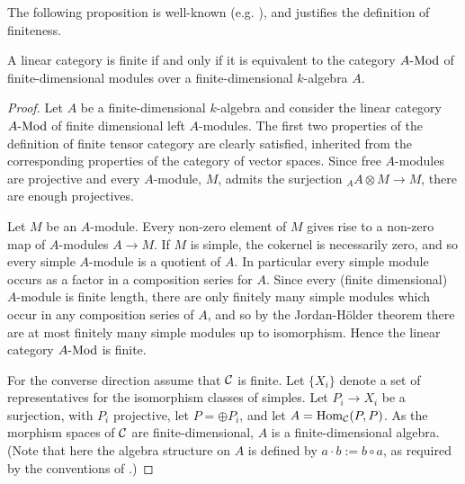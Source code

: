 \documentclass{amsart}
\begin{document}
The following proposition is well-known (e.g. \cite[\S9.6]{MR2808160}), and justifies the definition of finiteness.

\begin{proposition}
A linear category is finite if and only if it is equivalent to the category $\Mod{A}{}$ of finite-dimensional modules over a finite-dimensional $k$-algebra $A$.
\end{proposition}
\begin{proof}
	Let $A$ be a finite-dimensional $k$-algebra and consider the linear category $\Mod{A}{}$ of finite dimensional left $A$-modules. The first two properties of the definition of finite tensor category are clearly satisfied, inherited from the corresponding properties of the category of vector spaces. Since free $A$-modules are projective and every $A$-module, $M$, admits the surjection ${}_A A \otimes M \to M$, there are enough projectives. 
	
	Let $M$ be an $A$-module. Every non-zero element of $M$ gives rise to a non-zero map of $A$-modules $A \to M$. If $M$ is simple, the cokernel is necessarily zero, and so every simple $A$-module is a quotient of $A$. In particular every simple module occurs as a factor in a composition series for $A$. Since every (finite dimensional) $A$-module is finite length, there are only finitely many simple modules which occur in any composition series of $A$, and so by the Jordan-H\"older theorem there are at most finitely many simple modules up to isomorphism. Hence the linear category $\Mod{A}{}$ is finite.
	
	For the converse direction assume that $\mathcal C$ is finite. Let $\{X_i\}$ denote a set of representatives for the isomorphism classes of simples. Let $P_i \to X_i$ be a surjection, with $P_i$ projective, let $P = \oplus P_i$, and let $A = \operatorname{Hom}_{\mathcal C}(P,P)$. As the morphism spaces of $\mathcal C$ are finite-dimensional, $A$ is a finite-dimensional algebra.  (Note that here the algebra structure on $A$ is defined by $a \cdot b := b \circ a$, as required by the conventions of \cite{DTCI}.)
	

\end{proof}
\end{document}
